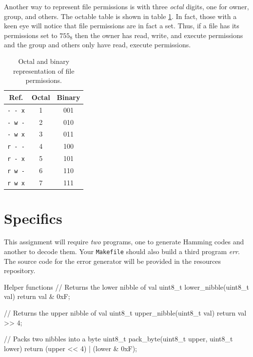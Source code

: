 \documentclass[11pt]{article}
\begin{document}
Another way to represent file permissions is with three \emph{octal} digits, one for owner, group, and others.
The octable table is shown in table \ref{octal}. In fact, those with a keen eye will notice that file permissions
are in fact a set. Thus, if a file has its permissions set to $755_8$ then the owner has read, write, and 
execute permissions and the group and others only have read, execute permissions.

\begin{table}[h]
\centering
\begin{tabular}{ |c|c|c| } 
 \hline
  Ref. & Octal & Binary \\
  \hline
  \texttt{- - x} & 1 & 001 \\
  \texttt{- w -} & 2 & 010 \\
  \texttt{- w x} & 3 & 011 \\
  \texttt{r - -} & 4 & 100 \\
  \texttt{r - x} & 5 & 101 \\
  \texttt{r w -} & 6 & 110 \\
  \texttt{r w x} & 7 & 111 \\
 \hline
 
 \hline
\end{tabular}
\caption{Octal and binary representation of file permissions.}
\label{octal}
\end{table}

\section{Specifics}
This assignment will require \emph{two} programs, one to generate Hamming codes and another to decode them.
Your \texttt{Makefile} should also build a third program \emph{err}.
The source code for the error generator will be provided in the resources repository.

\begin{codelisting}{Helper functions}
 // Returns the lower nibble of val
 uint8_t lower_nibble(uint8_t val) {
     return val & 0xF;
 }
 
 // Returns the upper nibble of val
 uint8_t upper_nibble(uint8_t val) {
     return val >> 4;
 }
 
 // Packs two nibbles into a byte
 uint8_t pack_byte(uint8_t upper, uint8_t lower) {
     return (upper << 4) | (lower & 0xF);
 }
\end{codelisting}
\end{document}
